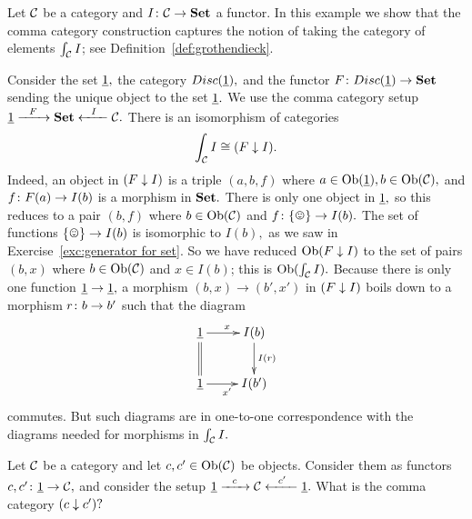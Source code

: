 \documentclass[CT4S-EN-RU]{subfiles}
\begin{document}
\begin{exampleENG}
Let $\mathcal{C}$ be a category and $I\colon\mathcal{C}\rightarrow{\mathbf{Set}}$ a functor. In this example we show that the comma category construction captures the notion of taking the category of elements $\int_\mathcal{C} I$; see Definition~\ref{def:grothendieck}. 

Consider the set $\underline{1},$ the category $Disc(\underline{1}),$ and the functor $F\colon Disc(\underline{1})\rightarrow{\mathbf{Set}}$ sending the unique object to the set $\underline{1}.$ We use the comma category setup $\underline{1}\xrightarrow{\ \ F\ \ }{\mathbf{Set}}\xleftarrow{\ \ I\ \ }\mathcal{C}.$ There is an isomorphism of categories 
$$\int_\mathcal{C} I\cong (F\downarrow I).$$
Indeed, an object in $(F\downarrow I)$ is a triple $(a,b,f)$ where $a\in\textnormal{Ob}(\underline{1}), b\in\textnormal{Ob}(\mathcal{C}),$ and $f\colon F(a)\rightarrow I(b)$ is a morphism in ${\mathbf{Set}}.$ There is only one object in $\underline{1},$ so this reduces to a pair $(b,f)$ where $b\in\textnormal{Ob}(\mathcal{C})$ and $f\taking \singleton\to I(b).$ The set of functions $\singleton\to I(b)$ is isomorphic to $I(b),$ as we saw in Exercise~\ref{exc:generator for set}. So we have reduced $\textnormal{Ob}(F\downarrow I)$ to the set of pairs $(b,x)$ where $b\in\textnormal{Ob}(\mathcal{C})$ and $x\in I(b)$; this is $\textnormal{Ob}(\int_\mathcal{C} I).$ Because there is only one function $\underline{1}\rightarrow\underline{1},$ a morphism $(b,x)\to(b',x')$ in $(F\downarrow I)$ boils down to a morphism $r\colon b\rightarrow b'$ such that the diagram 
$$\xymatrix{\ul{1}\ar[r]^x\ar@{=}[d]&I(b)\ar[d]^{I(r)}\\\ul{1}\ar[r]_{x'}&I(b')}$$
commutes. But such diagrams are in one-to-one correspondence with the diagrams needed for morphisms in $\int_\mathcal{C} I.$
\end{exampleENG}

\begin{exampleRUS}
\end{exampleRUS}

\begin{exerciseENG}
Let $\mathcal{C}$ be a category and let $c,c'\in\textnormal{Ob}(\mathcal{C})$ be objects. Consider them as functors $c,c'\colon\underline{1}\rightarrow\mathcal{C},$ and consider the setup $\underline{1}\xrightarrow{\ \ c\ \ }\mathcal{C}\xleftarrow{\ \ c'\ \ }\underline{1}.$ What is the comma category $(c\downarrow c')?$
\end{exerciseENG}

\begin{exerciseRUS}
\end{exerciseRUS}


\subsection{}\label{sec:arithmetic of categories}
\end{document}
